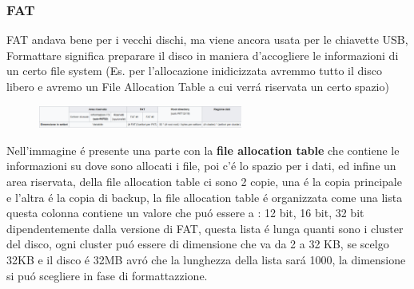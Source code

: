 \subsubsection*{FAT}
FAT andava bene per i vecchi dischi, ma viene ancora usata per le chiavette USB, Formattare significa preparare il disco in maniera
d'accogliere le informazioni di un certo file system (Es. per l'allocazione inidicizzata avremmo tutto il disco libero e avremo un File Allocation Table a cui verrá riservata un certo spazio)
\begin{figure}[H]
    \centering
    \includegraphics[width=0.6\textwidth]{immagini/DiscoFormattatoConFAT}
\end{figure}
Nell'immagine é presente una parte con la \textbf{file allocation table} che contiene le informazioni su dove sono allocati i file, poi c'é lo spazio per i dati, ed infine
un area riservata, della file allocation table ci sono 2 copie, una é la copia principale e l'altra é la copia di backup, la file allocation table é organizzata come una lista
questa colonna contiene un valore che puó essere a : 12 bit, 16 bit, 32 bit dipendentemente dalla versione di FAT, questa lista é lunga quanti sono i cluster del disco, ogni cluster
puó essere di dimensione che va da 2 a 32 KB, se scelgo 32KB e il disco é 32MB avró che la lunghezza della lista sará 1000, la dimensione si puó scegliere in fase di formattazzione.
